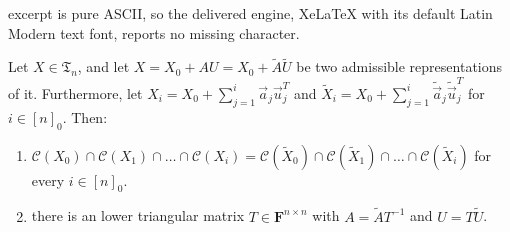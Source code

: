 \documentclass[10pt,a4paper]{amsart}
\newcommand{\Col}[1]{\mathcal{C}(#1)}
\newcommand{\F}{{\mathbf F}}
\newcommand{\va}{\vec{a}}
\newcommand{\vu}{\vec{u}}
\begin{document}
excerpt is pure ASCII, so the delivered engine, XeLaTeX with its default Latin Modern text font, reports no missing character.
\begin{lemma} \label{lemma:representation}
Let $X \in \mathfrak T_n$, and 
let $X = X_0 + AU = X_0 + \tilde A \tilde U$ 
be two admissible representations of it. Furthermore, let $X_i = X_0 + \sum_{j=1}^i \va_j\vu_j^T$ and $\tilde X_i = X_0 + \sum_{j=1}^i \tilde \va_j \tilde \vu_j^T$ for $i \in[n]_0$. Then:
\begin{enumerate}
\item\label{ite:lemma:representation2} $\Col{X_0} \cap \Col{X_1} \cap \ldots \cap \Col{X_i} = \Col{\tilde X_0} \cap \Col{\tilde X_1} \cap \ldots \cap \Col{\tilde X_i}$ for 
every $i\in[n]_0$.
\item\label{ite:lemma:representation1} there is an lower triangular matrix $T \in \F^{n\times n}$ with $A = \tilde A T^{-1}$ and $U = T \tilde U$. 
\end{enumerate}
\end{lemma}
\end{document}
